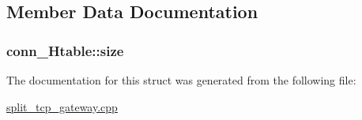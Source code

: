 \subsection{\-Member \-Data \-Documentation}
\hypertarget{structconn__Htable_af3a971a60b98b995ade7020013c5ffa6}{
\subsubsection[{size}]{ {\bf conn\-\_\-\-Htable\-::size}}}\label{structconn__Htable_af3a971a60b98b995ade7020013c5ffa6}


\-The documentation for this struct was generated from the following file\-:\begin{DoxyCompactItemize}
\item 
\hyperlink{split__tcp__gateway_8cpp}{split\-\_\-tcp\-\_\-gateway.\-cpp}\end{DoxyCompactItemize}
